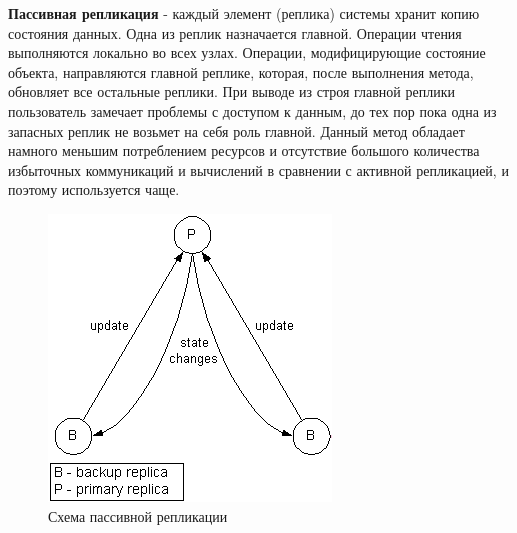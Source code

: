 \textbf{Пассивная репликация} - каждый элемент (реплика) системы хранит копию состояния данных. Одна из реплик назначается главной. Операции чтения выполняются локально во всех узлах. Операции, модифицирующие состояние объекта, направляются главной реплике, которая, после выполнения метода, обновляет все остальные реплики. При выводе из строя главной реплики пользователь замечает проблемы с доступом к данным, до тех пор пока одна из запасных реплик не возьмет на себя роль главной. Данный метод обладает намного меньшим потреблением ресурсов и отсутствие большого количества избыточных коммуникаций и вычислений в сравнении с активной репликацией, и поэтому используется чаще.
\begin{figure}[H]
	\centering
	\includegraphics[scale = 0.7]{24/passive.png}
	\caption{Схема пассивной репликации}
	\label{fig:passive_repl}
\end{figure}



	
